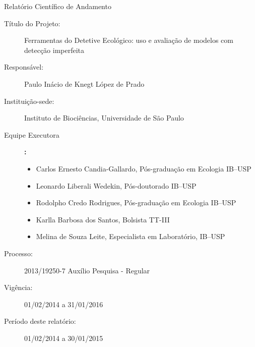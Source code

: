 {\fancyplain{}{\textsl{\thepage}}}
\begin{center}
  {\LARGE Relatório Científico de Andamento} 
\end{center}
\begin{description}
\item[Título do Projeto:] Ferramentas do Detetive Ecológico: uso e avaliação de modelos com detecção imperfeita
\item[Responsável:] Paulo Inácio de Knegt López de Prado
\item[Instituição-sede:] Instituto de Biociências, Universidade de São Paulo
\item[Equipe Executora]{\bf:}
  \begin{itemize}
  \item Carlos Ernesto Candia-Gallardo, Pós-graduação em Ecologia IB--USP
  \item Leonardo Liberali Wedekin, Pós-doutorado IB--USP
  \item Rodolpho Credo Rodrigues, Pós-graduação em Ecologia IB--USP
  \item Karlla Barbosa dos Santos, Bolsista TT-III
  \item Melina de Souza Leite, Especialista em Laboratório, IB--USP
  \end{itemize}
\item[Processo:] 2013/19250-7 Auxílio Pesquisa - Regular 
\item[Vigência:] 01/02/2014 a 31/01/2016 
\item[Período deste relatório:] 01/02/2014 a 30/01/2015
\end{description}
